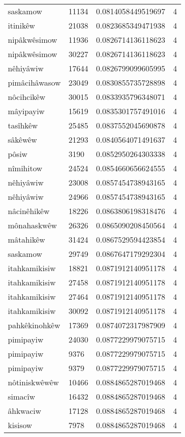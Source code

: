 \begin{longtable}{llll}
saskamow & 11134 & 0.0814058449519697 & 4 \\
itinikêw & 21038 & 0.0823685349471938 & 4 \\
nipâkwêsimow & 11936 & 0.0826714136118623 & 4 \\
nipâkwêsimow & 30227 & 0.0826714136118623 & 4 \\
nêhiyâwiw & 17644 & 0.0826799099605995 & 4 \\
pimâcihâwasow & 23049 & 0.0830855735728898 & 4 \\
nôcihcikêw & 30015 & 0.0833935796348071 & 4 \\
mâyipayiw & 15619 & 0.0835301757491016 & 4 \\
tasîhkêw & 25485 & 0.0837552045690878 & 4 \\
sâkêwêw & 21293 & 0.0840564071491637 & 4 \\
pôsiw & 3190 & 0.0852950264303338 & 4 \\
nîmihitow & 24524 & 0.0854660656624555 & 4 \\
nêhiyâwiw & 23008 & 0.0857454738943165 & 4 \\
nêhiyâwiw & 24966 & 0.0857454738943165 & 4 \\
nâcinêhikêw & 18226 & 0.0863806198318476 & 4 \\
mônahaskwêw & 26326 & 0.0865090208450564 & 4 \\
mâtahikêw & 31424 & 0.0867529594423854 & 4 \\
saskamow & 29749 & 0.0867647179292304 & 4 \\
itahkamikisiw & 18821 & 0.0871912140951178 & 4 \\
itahkamikisiw & 27458 & 0.0871912140951178 & 4 \\
itahkamikisiw & 27464 & 0.0871912140951178 & 4 \\
itahkamikisiw & 30092 & 0.0871912140951178 & 4 \\
pahkêkinohkêw & 17369 & 0.0874072317987909 & 4 \\
pimipayiw & 24030 & 0.0877229979075715 & 4 \\
pimipayiw & 9376 & 0.0877229979075715 & 4 \\
pimipayiw & 9379 & 0.0877229979075715 & 4 \\
nôtiniskwêwêw & 10466 & 0.0884865287019468 & 4 \\
simacîw & 16432 & 0.0884865287019468 & 4 \\
âhkwaciw & 17128 & 0.0884865287019468 & 4 \\
kisisow & 7978 & 0.0884865287019468 & 4 \\

\end{longtable}
